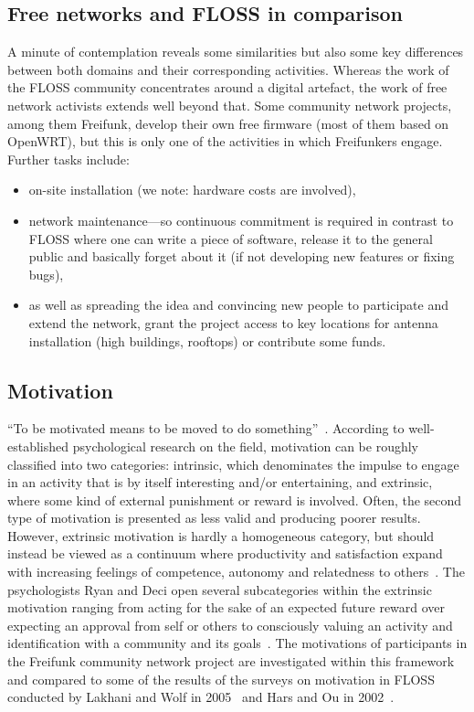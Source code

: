 \subsection{Free networks and FLOSS in comparison}\label{subsec:comparison}
A minute of contemplation reveals some similarities but also some key differences between both domains and their corresponding activities. %
Whereas the work of the FLOSS community concentrates around a digital artefact, the work of free network activists extends well beyond that.
Some community network projects, among them Freifunk, develop their own free firmware (most of them based on OpenWRT), but this is only one of the activities in which Freifunkers engage.
Further tasks include:
\begin{itemize}
  \item on-site installation (we note: hardware costs are involved),
  \item network maintenance---so continuous commitment is required in contrast to FLOSS where one can write a piece of software, release it to the general public and basically forget about it (if not developing new features or fixing bugs),
  \item as well as spreading the idea and convincing new people to participate and extend the network, grant the project access to key locations for antenna installation (high buildings, rooftops) or contribute some funds. %
\end{itemize}

\subsection{Motivation}\label{subsec:motivation}
``To be motivated means to be moved to do something''~\cite{RyDe2000}.
According to well-established psychological research on the field, motivation can be roughly classified into two categories:
intrinsic, which denominates the impulse to engage in an activity that is by itself interesting and/or entertaining,
and extrinsic, where some kind of external punishment or reward is involved.
Often, the second type of motivation is presented as less valid and producing poorer results. %
However, extrinsic motivation is hardly a homogeneous category, but should instead be viewed as a continuum where productivity and satisfaction expand with increasing feelings of competence, autonomy and relatedness to others~\cite{RyDe2000}.
The psychologists Ryan and Deci open several subcategories within the extrinsic motivation ranging from acting for the sake of an expected future reward over expecting an approval from self or others to consciously valuing an activity and identification with a community and its goals~\cite{RyDe2000}.
The motivations of participants in the Freifunk community network project are investigated within this framework and compared to some of the results of the surveys on motivation in FLOSS conducted by Lakhani and Wolf in 2005~\cite{LakWo2005} and Hars and Ou in 2002~\cite{HarOu2002}.

